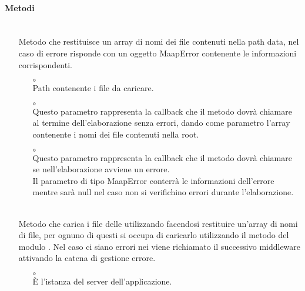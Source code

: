 \paragraph*{Metodi}
\begin{itemize}
\item[]  \\ Metodo che restituisce un array di nomi dei file contenuti nella path  data, nel caso di errore risponde con un oggetto MaapError contenente le informazioni corrispondenti.
\begin{itemize}\addtolength{\itemsep}{-0.5\baselineskip}
\item[$\circ$]  \\ Path contenente i file  da caricare.
\item[$\circ$]  \\ Questo parametro rappresenta la callback che il metodo dovrà chiamare al termine dell'elaborazione senza errori, dando come parametro l'array contenente i nomi dei file contenuti nella root.
\item[$\circ$]  \\ Questo parametro rappresenta la callback che il metodo dovrà chiamare se nell'elaborazione avviene un errore. \\ Il parametro di tipo MaapError conterrà le informazioni dell'errore mentre sarà null nel caso non si verifichino errori durante l'elaborazione.
\end{itemize}
\item[]  \\ Metodo che carica i file  delle  utilizzando  facendosi restituire un'array di nomi di file, per ognuno di questi si occupa di caricarlo utilizzando il metodo  del modulo . Nel caso ci siano errori nei  viene richiamato il successivo middleware attivando la catena di gestione errore.
\begin{itemize}\addtolength{\itemsep}{-0.5\baselineskip}
\item[$\circ$]  \\ È l'istanza del server dell'applicazione.
\end{itemize}
\end{itemize}

